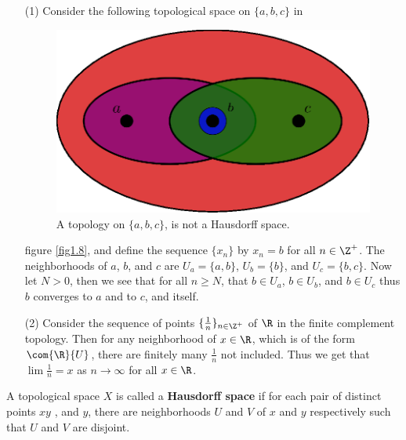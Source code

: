 \begin{example}
    \begin{enumerate}
        \item[(1)] Consider the following topological space on $\{a,b,c\}$ in
            \begin{figure}[h]
                \centering
            \includegraphics[scale = 0.5]{Figures/Chapter1/non_hausdorff_space.eps}
            \caption{A topology on $\{a,b,c\}$, is not a Hausdorff space.}
            \label{fig_1.8}
        \end{figure}
        figure \ref{fig1.8}, and define the sequence $\{x_n\}$ by  $x_n=b$ for all
        $n \in \Z^+$. The neighborhoods of  $a$, $b$, and $c$ are
        $U_a=\{a,b\}$,  $U_b=\{b\}$, and  $U_c=\{b,c\}$. Now let $N>0$, then we see
        that for all  $n \geq N$, that  $b \in U_a$, $b \in U_b$, and $b \in U_c$
        thus  $b$ converges to  $a$ and to  $c$, and itself.

    \item[(2)] Consider the sequence of points $\{\frac{1}{n}\}_{n \in \Z^+}$ of
        $\R$ in the finite complement topology. Then for any neighborhood  of
        $x \in \R$, which is of the form $\com{\R}{U}$, there are finitely many
        $\frac{1}{n}$ not included. Thus we get that $\lim{\frac{1}{n}}=x$ as $n
        \rightarrow \infty$ for all $x \in \R$.
    \end{enumerate}
\end{example}

\begin{definition}
    A topological space $X$ is called a \textbf{Hausdorff space} if for each
    pair of distinct points  $xy$ , and $y$, there are neighborhoods $U$
    and $V$ of $x$ and $y$ respectively such that $U$ and $V$ are disjoint.
\end{definition}

